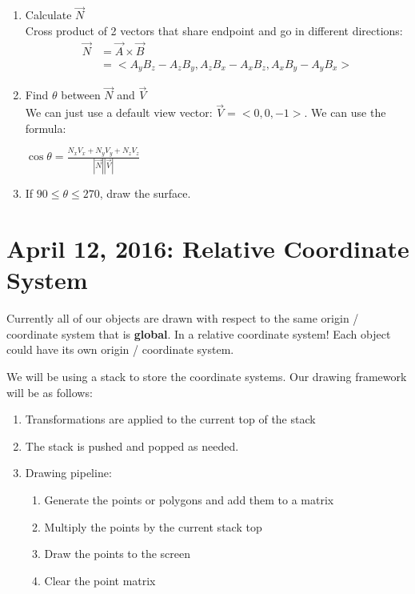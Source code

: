 \documentclass[11pt,fleqn]{article}
\theoremstyle{definition}
\begin{document}
\begin{enumerate}
    \item Calculate $\vec{N}$ \\
        \newline
        Cross product of 2 vectors that share endpoint and go in different
        directions:
        \begin{align*}
            \vec{N} &= \vec{A} \times \vec{B} \\
                    &= <A_yB_z - A_zB_y, A_zB_x - A_xB_z, A_xB_y - A_yB_x>
        \end{align*}
    \item Find $\theta$ between $\vec{N}$ and $\vec{V}$ \\
        \newline
        We can just use a default view vector: $\vec{V} = <0, 0, -1>$. We can use the
        formula:
        \begin{center}
            $\cos\theta = \frac{N_xV_x + N_yV_y + N_zV_z}{|\vec{N}||\vec{V}|}$
        \end{center}
    \item If $90 \leq \theta \leq 270$, draw the surface.
\end{enumerate}

\section{April 12, 2016: Relative Coordinate System}

Currently all of our objects are drawn with respect to the same origin / coordinate
system that is \textbf{global}. In a relative coordinate system!  Each object could
have its own origin / coordinate system.

We will be using a stack to store the coordinate systems. Our drawing framework will
be as follows:

\begin{enumerate}
    \item Transformations are applied to the current top of the stack
    \item The stack is pushed and popped as needed.
    \item Drawing pipeline:
        \begin{enumerate}
            \item Generate the points or polygons and add them to a matrix
            \item Multiply the points by the current stack top
            \item Draw the points to the screen
            \item Clear the point matrix
        \end{enumerate}
\end{enumerate}
\end{document}
